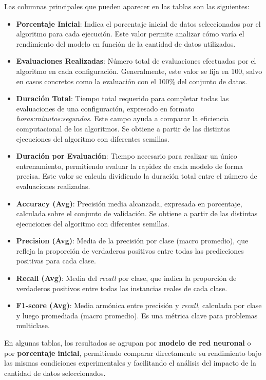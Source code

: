 Las columnas principales que pueden aparecer en las tablas son las siguientes:
\begin{itemize}
    \item \textbf{Porcentaje Inicial}: Indica el porcentaje inicial de datos seleccionados por el algoritmo para cada ejecución.
          Este valor permite analizar cómo varía el rendimiento del modelo en función de la cantidad de datos utilizados.
    \item \textbf{Evaluaciones Realizadas}: Número total de evaluaciones efectuadas por el algoritmo en cada configuración.
          Generalmente, este valor se fija en 100, salvo en casos concretos como la evaluación con el 100\% del conjunto de datos.
    \item \textbf{Duración Total}: Tiempo total requerido para completar todas las evaluaciones de una configuración, expresado en formato \textit{horas:minutos:segundos}.
          Este campo ayuda a comparar la eficiencia computacional de los algoritmos.
          Se obtiene a partir de las distintas ejecuciones del algoritmo con diferentes semillas.
    \item \textbf{Duración por Evaluación}: Tiempo necesario para realizar un único entrenamiento, permitiendo evaluar la rapidez de cada modelo de forma precisa.
          Este valor se calcula dividiendo la duración total entre el número de evaluaciones realizadas.
    \item \textbf{Accuracy (Avg)}: Precisión media alcanzada, expresada en porcentaje, calculada sobre el conjunto de validación.
          Se obtiene a partir de las distintas ejecuciones del algoritmo con diferentes semillas.
    \item \textbf{Precision (Avg)}: Media de la precisión por clase (macro promedio), que refleja la proporción de verdaderos positivos entre todas las predicciones positivas para cada clase.
    \item \textbf{Recall (Avg)}: Media del \emph{recall} por clase, que indica la proporción de verdaderos positivos entre todas las instancias reales de cada clase.
    \item \textbf{F1-score (Avg)}: Media armónica entre precisión y \emph{recall}, calculada por clase y luego promediada (macro promedio).
          Es una métrica clave para problemas multiclase.
\end{itemize}

En algunas tablas, los resultados se agrupan por \textbf{modelo de red neuronal} o por \textbf{porcentaje inicial},
permitiendo comparar directamente su rendimiento bajo las mismas condiciones experimentales y facilitando el análisis del impacto de la cantidad de datos seleccionados.

